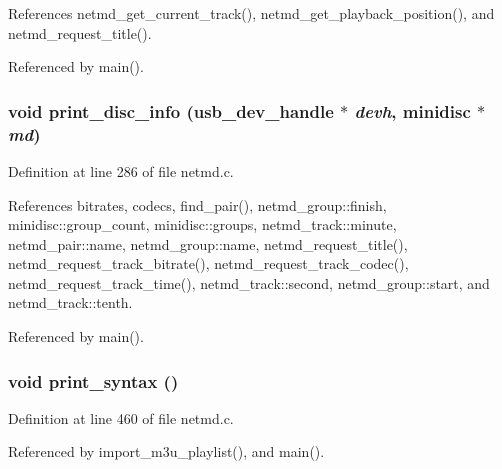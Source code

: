 References netmd\_\-get\_\-current\_\-track(), netmd\_\-get\_\-playback\_\-position(), and netmd\_\-request\_\-title().

Referenced by main().
\subsubsection[{print\_\-disc\_\-info}]{\setlength{\rightskip}{0pt plus 5cm}void print\_\-disc\_\-info (usb\_\-dev\_\-handle $\ast$ {\em devh}, \/  {\bf minidisc} $\ast$ {\em md})}\label{netmd_8c_ad41623d7049e472358e72af30d533343}


Definition at line 286 of file netmd.c.

References bitrates, codecs, find\_\-pair(), netmd\_\-group::finish, minidisc::group\_\-count, minidisc::groups, netmd\_\-track::minute, netmd\_\-pair::name, netmd\_\-group::name, netmd\_\-request\_\-title(), netmd\_\-request\_\-track\_\-bitrate(), netmd\_\-request\_\-track\_\-codec(), netmd\_\-request\_\-track\_\-time(), netmd\_\-track::second, netmd\_\-group::start, and netmd\_\-track::tenth.

Referenced by main().
\subsubsection[{print\_\-syntax}]{\setlength{\rightskip}{0pt plus 5cm}void print\_\-syntax ()}\label{netmd_8c_a7428958296f2a81b48b0d1150ff4cce0}


Definition at line 460 of file netmd.c.

Referenced by import\_\-m3u\_\-playlist(), and main().